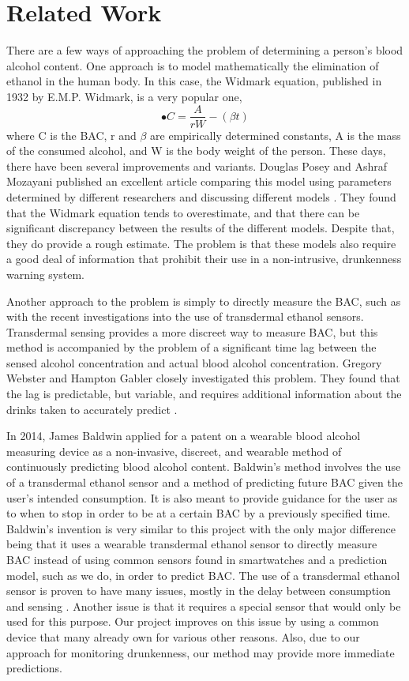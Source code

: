 \section{Related Work}

There are a few ways of approaching the problem of determining a person's blood alcohol content. One approach is to model mathematically the elimination of ethanol in the human body. In this case, the Widmark equation, published in 1932 by E.M.P. Widmark, is a very popular one, \begin{equation}
•C=\frac{A}{rW}-(\beta t)
\end{equation} where C is the BAC, r and $\beta$ are empirically determined constants, A is the mass of the consumed alcohol, and W is the body weight of the person.
	These days, there have been several improvements and variants. Douglas Posey and Ashraf Mozayani published an excellent article comparing this model using parameters determined by different researchers and discussing different models \cite{Posey:2007}. They found that the Widmark equation tends to overestimate, and that there can be significant discrepancy between the results of the different models. Despite that, they do provide a rough estimate. The problem is that these models also require a good deal of information that prohibit their use in a non-intrusive, drunkenness warning system.

Another approach to the problem is simply to directly measure the BAC, such as with the recent investigations into the use of transdermal ethanol sensors. Transdermal sensing provides a more discreet way to measure BAC, but this method is accompanied by the problem of a significant time lag between the sensed alcohol concentration and actual blood alcohol concentration. Gregory Webster and Hampton Gabler closely investigated this problem. They found that the lag is predictable, but variable, and requires additional information about the drinks taken to accurately predict \cite{Webster:2007}.

In 2014, James Baldwin applied for a patent on a wearable blood alcohol measuring device \cite{Baldwin:2014} as a non-invasive, discreet, and wearable method of continuously predicting blood alcohol content. Baldwin's method involves the use of a transdermal ethanol sensor and a method of predicting future BAC given the user's intended consumption. It is also meant to provide guidance for the user as to when to stop in order to be at a certain BAC by a previously specified time. Baldwin's invention is very similar to this project with the only major difference being that it uses a wearable transdermal ethanol sensor to directly measure BAC instead of using common sensors found in smartwatches and a prediction model, such as we do, in order to predict BAC. The use of a transdermal ethanol sensor is proven to have many issues, mostly in the delay between consumption and sensing \cite{Webster:2007}. Another issue is that it requires a special sensor that would only be used for this purpose. Our project improves on this issue by using a common device that many already own for various other reasons. Also, due to our approach for monitoring drunkenness, our method may provide more immediate predictions.  

